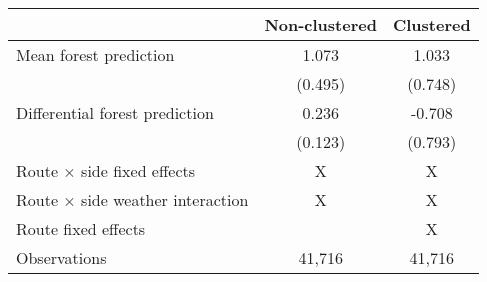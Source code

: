 \begingroup
\setlength{}
\setlength{}\fontsize{9.0pt}{10.8pt}\selectfont
\begin{longtable}{@{\extracolsep{\fill}}lcc}
\toprule
  & Non-clustered & Clustered \\ 
\midrule\addlinespace[2.5pt]
Mean forest prediction & 1.073 & 1.033 \\ 
 & (0.495) & (0.748) \\ 
Differential forest prediction & 0.236 & -0.708 \\ 
{} & {(0.123)} & {(0.793)} \\ 
Route × side fixed effects & X & X \\ 
Route × side weather interaction & X & X \\ 
Route fixed effects &  & X \\ 
Observations & 41,716 & 41,716 \\ 
\bottomrule
\end{longtable}
\endgroup

